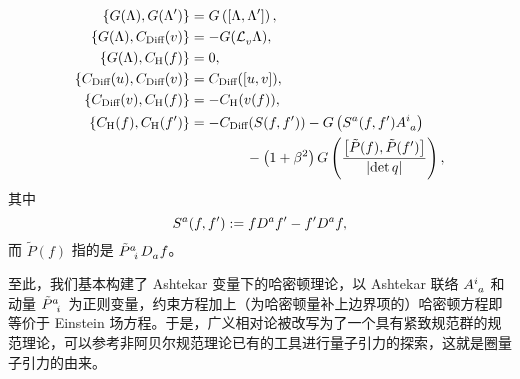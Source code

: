 		\begin{Property}
			\begin{equation}
				\begin{split}
					\left\{ G(\Lambda), G(\Lambda') \right\} &= G\left( \left[ \Lambda, \Lambda' \right] \right),\\
					\left\{ G(\Lambda), C_{\text{Diff}}(v) \right\} &= - G(\Ld{v} \Lambda),\\
					\left\{ G(\Lambda), C_{\text{H}}(f) \right\} &= 0,\\
					\left\{ C_{\text{Diff}}(u), C_{\text{Diff}}(v) \right\} &= C_{\text{Diff}}([u,v]),\\
					\left\{ C_{\text{Diff}}(v), C_{\text{H}}(f) \right\} &= - C_{\text{H}}(v(f)),\\
					\left\{ C_{\text{H}}(f), C_{\text{H}}(f') \right\} &= - C_{\text{Diff}}(S(f,f')) - G\left(\tensor{S}{^a}(f,f') \tensor{A}{^i_a} \right)\\
					&\qquad\qquad - \left( 1+\beta^2 \right) G\left( \frac{\left[ \tilde{P}(f), \tilde{P}(f') \right]}{\abs{\det q}} \right),\label{eq-constrain_algebra}
				\end{split}
			\end{equation}
			其中
			\begin{equation}
				\tensor{S}{^a}(f,f') := f \tensor{D}{^a} f' - f' \tensor{D}{^a} f,
			\end{equation}
			而 $\tilde{P}(f)$ 指的是 $\tensor{\tilde{P}}{^a_i} \tensor{D}{_a} f$。
		\end{Property}


		至此，我们基本构建了 Ashtekar 变量下的哈密顿理论，以 Ashtekar 联络 $\tensor{A}{^i_a}$ 和动量 $\tensor{\tilde{P}}{^a_i}$ 为正则变量，约束方程加上（为哈密顿量补上边界项的）哈密顿方程即等价于 Einstein 场方程。于是，广义相对论被改写为了一个具有紧致规范群的规范理论，可以参考非阿贝尔规范理论已有的工具进行量子引力的探索，这就是圈量子引力的由来。
		
